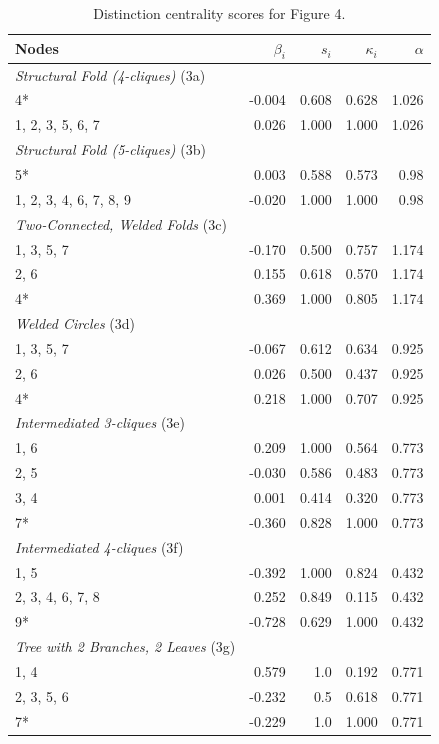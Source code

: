 \begin{table}
\footnotesize
\centering
\caption{\label{tab:figure4}Distinction centrality scores for Figure 4.}
\centering
\begin{tabular}[t]{lrrrr}
Nodes & $\beta_i$ & $s_i$ & $\kappa_i$ & $\alpha$\\
\toprule
\midrule
\textit{Structural Fold (4-cliques)} (3a)\\
4* & -0.004 & 0.608 & 0.628 & 1.026\\
1, 2, 3, 5, 6, 7 & 0.026 & 1.000 & 1.000 & 1.026\\
\midrule
\midrule
\textit{Structural Fold (5-cliques)} (3b)\\
5* & 0.003 & 0.588 & 0.573 & 0.98\\
1, 2, 3, 4, 6, 7, 8, 9 & -0.020 & 1.000 & 1.000 & 0.98\\
\midrule
\midrule
\textit{Two-Connected, Welded Folds} (3c)\\
1, 3, 5, 7 & -0.170 & 0.500 & 0.757 & 1.174\\
2, 6 & 0.155 & 0.618 & 0.570 & 1.174\\
4* & 0.369 & 1.000 & 0.805 & 1.174\\
\midrule
\midrule
\textit{Welded Circles} (3d)\\
1, 3, 5, 7 & -0.067 & 0.612 & 0.634 & 0.925\\
2, 6 & 0.026 & 0.500 & 0.437 & 0.925\\
4* & 0.218 & 1.000 & 0.707 & 0.925\\
\midrule
\midrule
\textit{Intermediated 3-cliques} (3e)\\
1, 6 & 0.209 & 1.000 & 0.564 & 0.773\\
2, 5 & -0.030 & 0.586 & 0.483 & 0.773\\
3, 4 & 0.001 & 0.414 & 0.320 & 0.773\\
7* & -0.360 & 0.828 & 1.000 & 0.773\\
\midrule
\midrule
\textit{Intermediated 4-cliques} (3f)\\
1, 5 & -0.392 & 1.000 & 0.824 & 0.432\\
2, 3, 4, 6, 7, 8 & 0.252 & 0.849 & 0.115 & 0.432\\
9* & -0.728 & 0.629 & 1.000 & 0.432\\
\midrule
\midrule
\textit{Tree with 2 Branches, 2 Leaves} (3g)\\
1, 4 & 0.579 & 1.0 & 0.192 & 0.771\\
2, 3, 5, 6 & -0.232 & 0.5 & 0.618 & 0.771\\
7* & -0.229 & 1.0 & 1.000 & 0.771\\

\end{tabular}
\end{table}
